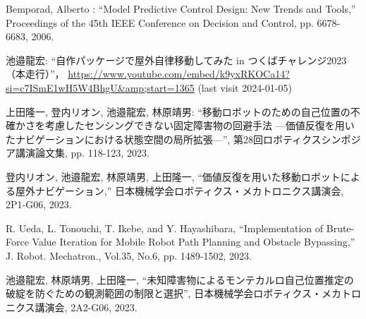 \documentclass[twocolumn,9pt]{jsproceedings}
\begin{document}
\begin{thebibliography}{99}
  Bemporad, Alberto : ``Model Predictive Control Design: New Trends and Tools,''
  Proceedings of the 45th IEEE Conference on Decision and Control, pp. 6678-6683, 2006.

  池邉龍宏: ``自作パッケージで屋外自律移動してみた in つくばチャレンジ2023（本走行）''，
  \url{https://www.youtube.com/embed/k9yxRKOCa14?si=c7ISmE1wH5W4BhgU&amp;start=1365} (last visit 2024-01-05)

上田隆一, 登内リオン, 池邉龍宏, 林原靖男: ``移動ロボットのための自己位置の不確かさを考慮したセンシングできない固定障害物の回避手法 ---価値反復を用いたナビゲーションにおける状態空間の局所拡張---'', 第28回ロボティクスシンポジア講演論文集, pp. 118-123, 2023.

  登内リオン, 池邉龍宏, 林原靖男, 上田隆一, ``価値反復を用いた移動ロボットによる屋外ナビゲーション,''
  日本機械学会ロボティクス・メカトロニクス講演会, 2P1-G06, 2023.

  R. Ueda, L. Tonouchi, T. Ikebe, and Y. Hayashibara, ``Implementation of Brute-Force Value Iteration for Mobile Robot Path Planning and Obstacle Bypassing,''
  J. Robot. Mechatron., Vol.35, No.6, pp. 1489-1502, 2023.

  池邉龍宏, 林原靖男, 上田隆一, ``未知障害物によるモンテカルロ自己位置推定の破綻を防ぐための観測範囲の制限と選択'',
  日本機械学会ロボティクス・メカトロニクス講演会, 2A2-G06, 2023.
\end{thebibliography}
\normalsize

\clearpage

\end{document}
